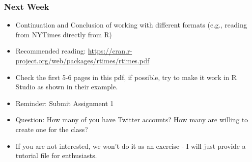 \documentclass{beamer}
\begin{document}
\begin{frame}
\frametitle{Next Week}
\begin{itemize}
\item Continuation and Conclusion of working with different formats (e.g., reading from NYTimes directly from R)
\item Recommended reading: \url{https://cran.r-project.org/web/packages/rtimes/rtimes.pdf}
\item Check the first 5-6 pages in this pdf, if possible, try to make it work in R Studio as shown in their example.
\item Reminder: Submit Assignment 1 \pause
\item Question: How many of you have Twitter accounts? How many are willing to create one for the class? 
\item If you are not interested, we won't do it as an exercise - I will just provide a tutorial file for enthusiasts.
\end{itemize}
\end{frame}
\end{document}
